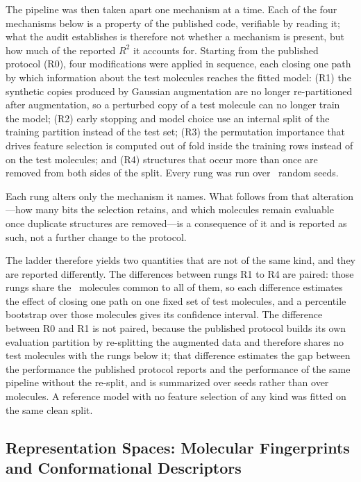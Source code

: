 The pipeline was then taken apart one mechanism at a time. Each of the four mechanisms below is a property of the
published code, verifiable by reading it; what the audit establishes is therefore not whether a mechanism is present,
but how much of the reported $R^2$ it accounts for. Starting from the published protocol (R0), four modifications were
applied in sequence, each closing one path by which information about the test molecules reaches the fitted model:
(R1) the synthetic copies produced by Gaussian augmentation are no longer re-partitioned after augmentation, so a
perturbed copy of a test molecule can no longer train the model; (R2) early stopping and model choice use an internal
split of the training partition instead of the test set; (R3) the permutation importance that drives feature selection
is computed out of fold inside the training rows instead of on the test molecules; and (R4) structures that occur more
than once are removed from both sides of the split. Every rung was run over \KarReproNSeeds\ random seeds.

Each rung alters only the mechanism it names. What follows from that alteration---how many bits the selection retains,
and which molecules remain evaluable once duplicate structures are removed---is a consequence of it and is reported as
such, not a further change to the protocol.

The ladder therefore yields two quantities that are not of the same kind, and they are reported differently. The
differences between rungs R1 to R4 are paired: those rungs share the \KarLadderNCommonTest\ molecules common to all of
them, so each difference estimates the effect of closing one path on one fixed set of test molecules, and a percentile
bootstrap over those molecules gives its confidence interval. The difference between R0 and R1 is not paired, because
the published protocol builds its own evaluation partition by re-splitting the augmented data and therefore shares no
test molecules with the rungs below it; that difference estimates the gap between the performance the published
protocol reports and the performance of the same pipeline without the re-split, and is summarized over seeds rather
than over molecules. A reference model with no feature selection of any kind was fitted on the same clean split.


\subsection{Representation Spaces: Molecular Fingerprints and Conformational Descriptors}

